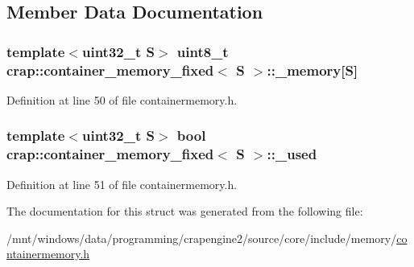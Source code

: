 \subsection{Member Data Documentation}
\hypertarget{structcrap_1_1container__memory__fixed_aca7e7c7805d9307b7067b736e9b4647f}{
\subsubsection[{\+\_\+memory}]{\setlength{\rightskip}{0pt plus 5cm}template$<$uint32\+\_\+t S$>$ uint8\+\_\+t {\bf crap\+::container\+\_\+memory\+\_\+fixed}$<$ S $>$\+::\+\_\+memory\mbox{[}S\mbox{]}}}\label{structcrap_1_1container__memory__fixed_aca7e7c7805d9307b7067b736e9b4647f}


Definition at line 50 of file containermemory.\+h.

\hypertarget{structcrap_1_1container__memory__fixed_aa017408f7c4feeb5fe1ad88338a237ab}{
\subsubsection[{\+\_\+used}]{\setlength{\rightskip}{0pt plus 5cm}template$<$uint32\+\_\+t S$>$ bool {\bf crap\+::container\+\_\+memory\+\_\+fixed}$<$ S $>$\+::\+\_\+used}}\label{structcrap_1_1container__memory__fixed_aa017408f7c4feeb5fe1ad88338a237ab}


Definition at line 51 of file containermemory.\+h.



The documentation for this struct was generated from the following file\+:\begin{DoxyCompactItemize}
\item 
/mnt/windows/data/programming/crapengine2/source/core/include/memory/\hyperlink{containermemory_8h}{containermemory.\+h}\end{DoxyCompactItemize}
